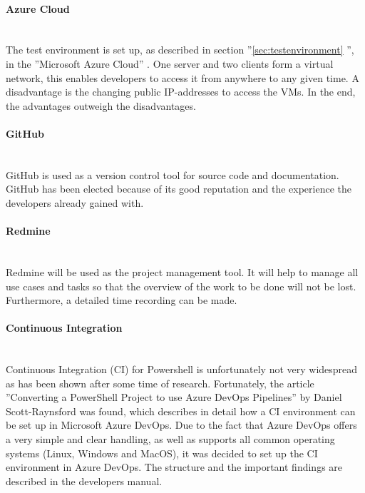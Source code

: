 \paragraph{Azure Cloud}\ \\
The test environment is set up, as described in section ''\ref{sec:testenvironment} '', in the ''Microsoft Azure Cloud'' \cite{Azure}. One server and two clients form a virtual network, this enables developers to access it from anywhere to any given time. A disadvantage is the changing public IP-addresses to access the VMs. In the end, the advantages outweigh the disadvantages.

\paragraph{GitHub}\ \\
GitHub \cite{GitHub} is used as a version control tool for source code and documentation. GitHub has been elected because of its good reputation and the experience the developers already gained with.

\paragraph{Redmine}\ \\
Redmine \cite{Redmine} will be used as the project management tool. It will help to manage all use cases and tasks so that the overview of the work to be done will not be lost. Furthermore, a detailed time recording can be made.

\clearpage

\paragraph{Continuous Integration}\ \\
Continuous Integration (CI) for Powershell is unfortunately not very widespread as has been shown after some time of research. Fortunately, the article ''Converting a PowerShell Project to use Azure DevOps Pipelines'' \cite{CI} by Daniel Scott-Raynsford was found, which describes in detail how a CI environment can be set up in Microsoft Azure DevOps. Due to the fact that Azure DevOps offers a very simple and clear handling, as well as supports all common operating systems (Linux, Windows and MacOS), it was decided to set up the CI environment in Azure DevOps. The structure and the important findings are described in the developers manual.

